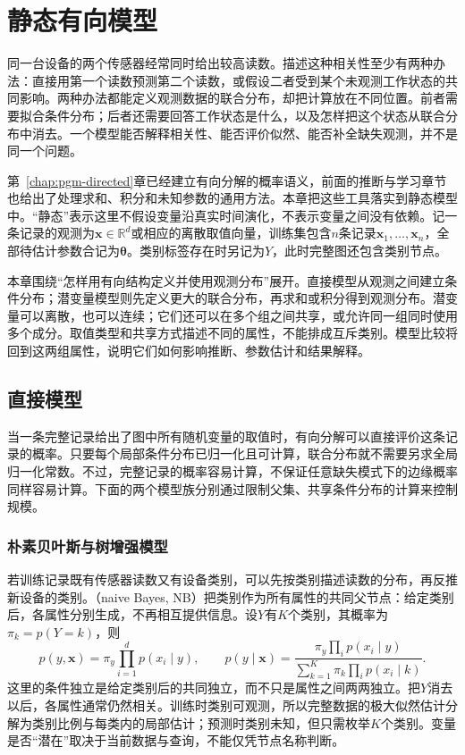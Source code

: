 \chapter{静态有向模型}
\label{chap:pgm-static-directed}

同一台设备的两个传感器经常同时给出较高读数。描述这种相关性至少有两种办法：直接用第一个读数预测第二个读数，或假设二者受到某个未观测工作状态的共同影响。两种办法都能定义观测数据的联合分布，却把计算放在不同位置。前者需要拟合条件分布；后者还需要回答工作状态是什么，以及怎样把这个状态从联合分布中消去。一个模型能否解释相关性、能否评价似然、能否补全缺失观测，并不是同一个问题。

第~\ref{chap:pgm-directed}章已经建立有向分解的概率语义，前面的推断与学习章节也给出了处理求和、积分和未知参数的通用方法。本章把这些工具落实到静态模型中。“静态”表示这里不假设变量沿真实时间演化，不表示变量之间没有依赖。记一条记录的观测为$\bm{x}\in\mathbb{R}^d$或相应的离散取值向量，训练集包含$n$条记录$\bm{x}_1,\ldots,\bm{x}_n$，全部待估计参数合记为$\bm{\theta}$。类别标签存在时另记为$Y$，此时完整图还包含类别节点。

本章围绕“怎样用有向结构定义并使用观测分布”展开。直接模型从观测之间建立条件分布；潜变量模型则先定义更大的联合分布，再求和或积分得到观测分布。潜变量可以离散，也可以连续；它们还可以在多个组之间共享，或允许同一组同时使用多个成分。取值类型和共享方式描述不同的属性，不能排成互斥类别。模型比较将回到这两组属性，说明它们如何影响推断、参数估计和结果解释。

\section{直接模型}
\label{sec:pgm-static-directed-direct}

当一条完整记录给出了图中所有随机变量的取值时，有向分解可以直接评价这条记录的概率。只要每个局部条件分布已归一化且可计算，联合分布就不需要另求全局归一化常数。不过，完整记录的概率容易计算，不保证任意缺失模式下的边缘概率同样容易计算。下面的两个模型族分别通过限制父集、共享条件分布的计算来控制规模。

\subsection{朴素贝叶斯与树增强模型}
\label{sec:pgm-static-directed-naive-tan}

若训练记录既有传感器读数又有设备类别，可以先按类别描述读数的分布，再反推新设备的类别。（naive Bayes, NB）把类别作为所有属性的共同父节点：给定类别后，各属性分别生成，不再相互提供信息。设$Y$有$K$个类别，其概率为$\pi_k=p(Y=k)$，则
\begin{equation}
  \label{eq:pgm-static-directed-naive}
  p(y,\bm{x})=\pi_y\prod_{i=1}^{d}p(x_i\mid y),\qquad
  p(y\mid\bm{x})=
  \frac{\pi_y\prod_i p(x_i\mid y)}
       {\sum_{k=1}^{K}\pi_k\prod_i p(x_i\mid k)}.
\end{equation}
这里的条件独立是给定类别后的共同独立，而不只是属性之间两两独立。把$Y$消去以后，各属性通常仍然相关。训练时类别可观测，所以完整数据的极大似然估计分解为类别比例与每类内的局部估计；预测时类别未知，但只需枚举$K$个类别。变量是否“潜在”取决于当前数据与查询，不能仅凭节点名称判断。

